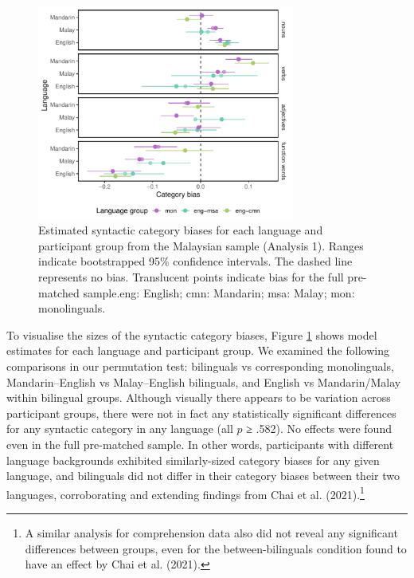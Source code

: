 \documentclass[10pt, letterpaper]{article}
\begin{document}
\begin{CodeChunk}
\begin{figure}[t]

{\centering \includegraphics[width=240pt]{figs/my_bias-1} 

}

\caption[Estimated syntactic category biases for each language and participant group from the Malaysian sample (Analysis 1)]{Estimated syntactic category biases for each language and participant group from the Malaysian sample (Analysis 1). Ranges indicate bootstrapped 95\% confidence intervals. The dashed line represents no bias. Translucent points indicate bias for the full pre-matched sample.\protect\footnotemark eng: English; cmn: Mandarin; msa: Malay; mon: monolinguals.}\label{fig:my_bias}
\end{figure}
\end{CodeChunk}


To visualise the sizes of the syntactic category biases, Figure
\ref{fig:my_bias} shows model estimates for each language and
participant group. We examined the following comparisons in our
permutation test: bilinguals vs corresponding monolinguals,
Mandarin--English vs Malay--English bilinguals, and English vs
Mandarin/Malay within bilingual groups. Although visually there appears
to be variation across participant groups, there were not in fact any
statistically significant differences for any syntactic category in any
language (all \(p\) ≥ .582). No effects were found even in the full
pre-matched sample. In other words, participants with different language
backgrounds exhibited similarly-sized category biases for any given
language, and bilinguals did not differ in their category biases between
their two languages, corroborating and extending findings from Chai et
al. (2021).\footnote{A similar analysis for comprehension data also did
  not reveal any significant differences between groups, even for the
  between-bilinguals condition found to have an effect by Chai et al.
  (2021).}
\end{document}
